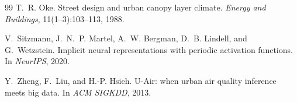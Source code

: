 \documentclass[10pt]{article}
\begin{document}
\begin{thebibliography}{99}
T.~R. Oke. Street design and urban canopy layer climate. \emph{Energy and
Buildings}, 11(1--3):103--113, 1988.

V.~Sitzmann, J.~N.~P. Martel, A.~W. Bergman, D.~B. Lindell, and G.~Wetzstein.
Implicit neural representations with periodic activation functions. In
\emph{NeurIPS}, 2020.

Y.~Zheng, F.~Liu, and H.-P. Hsieh. U-Air: when urban air quality inference meets
big data. In \emph{ACM SIGKDD}, 2013.
\end{thebibliography}
\end{document}
